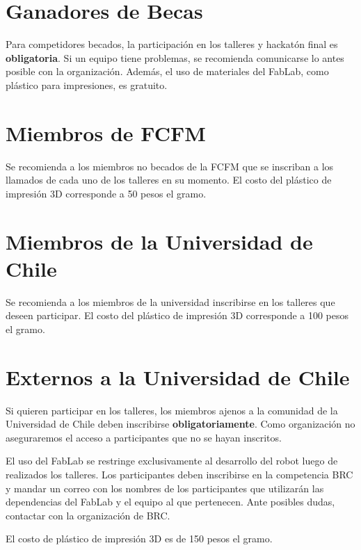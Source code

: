 \section{Ganadores de Becas}

Para competidores becados, la participación en los talleres y hackatón final es \textbf{obligatoria}.
Si un equipo tiene problemas, se recomienda comunicarse lo antes posible con la organización.
Además, el uso de materiales del FabLab, como plástico para impresiones, es gratuito.

\section{Miembros de FCFM}

Se recomienda a los miembros no becados de la FCFM que se inscriban a los llamados de cada uno de los talleres en su momento. 
El costo del plástico de impresión 3D corresponde a 50 pesos el gramo.

\section{Miembros de la Universidad de Chile}

Se recomienda a los miembros de la universidad inscribirse en los talleres que deseen participar.
El costo del plástico de impresión 3D corresponde a 100 pesos el gramo.

\section{Externos a la Universidad de Chile}
Si quieren participar en los talleres, los miembros ajenos a la comunidad de la Universidad de Chile deben inscribirse \textbf{obligatoriamente}. 
Como organización no aseguraremos el acceso a participantes que no se hayan inscritos.

El uso del FabLab se restringe exclusivamente al desarrollo del robot luego de realizados los talleres.
Los participantes deben inscribirse en la competencia BRC y mandar un correo con los nombres de los participantes que utilizarán las dependencias del FabLab y el equipo al que pertenecen.
Ante posibles dudas, contactar con la organización de BRC.

El costo de plástico de impresión 3D es de 150 pesos el gramo.


